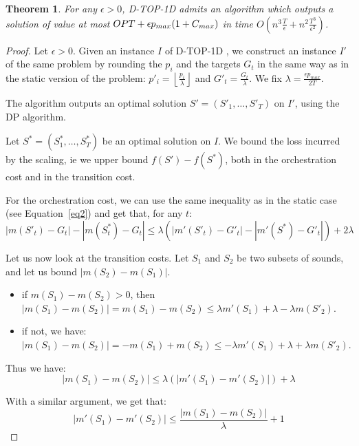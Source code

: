 \documentclass[a4paper]{book}
\newtheorem{theorem}{Theorem}[chapter]
\newtheorem{proof}{\noindent{\bf Proof.} }
\newcommand{\dynoned}{{\sc D-TOP-1D }}
\begin{document}
\begin{theorem}
For any $\epsilon>0$, \dynoned admits an algorithm which outputs a solution of value at most ${\sc OPT}+\epsilon p_{max}(1+C_{max})$ in time $O\left(n^3\frac{T}{\epsilon}+n^2\frac{T^3}{\epsilon^2}\right)$.
\end{theorem}


\begin{proof}
Let $\epsilon >0$. Given an instance $I$ of \dynoned, we construct an instance $I'$ of the same problem by rounding the $p_i$ and the targets $G_t$ in the same way as in the static version of the problem: $p'_i=\left\lfloor \frac{p_i}{\lambda}\right\rfloor$ and $G'_t=\frac{G_t}{\lambda}$. We fix $\lambda=\frac{\epsilon p_{max}}{2T}$.

The algorithm outputs an optimal solution $S'=(S'_1,\dots,S'_T)$  on $I'$, using the DP algorithm. 

Let $S^*=(S^*_1,\dots,S^*_T)$ be an optimal solution on $I$. We bound the loss incurred by the scaling, ie we upper bound $f(S')-f(S^*)$, both in the orchestration cost and in the transition cost.

For the orchestration cost, we can use the same inequality as in the static case (see Equation~\ref{eq2}) and get that, for any $t$:
\begin{equation}
|m(S'_t)-G_t|-|m(S^*_t)-G_t|  \leq   \lambda (\left|m'(S'_t) - G'_t\right| - \left|m'(S^*)-G'_t\right|) + 2\lambda \label{eq:bound2}
\end{equation}

Let us now look at the transition costs. Let $S_1$ and $S_2$ be two subsets of sounds, and let us bound $|m(S_2)-m(S_1)|$.
\begin{itemize}\item if $m(S_1)-m(S_2)>0$,  then $|m(S_1)-m(S_2)|=m(S_1)-m(S_2) \leq \lambda m'(S_1) + \lambda - \lambda m(S'_2)$.
\item if not, we have: $|m(S_1)-m(S_2)|=-m(S_1)+m(S_2) \leq -\lambda m'(S_1) + \lambda + \lambda m(S'_2)$.
\end{itemize}

Thus we have: \begin{equation}\label{eq:b3}
    |m(S_1)-m(S_2)|\leq \lambda(|m'(S_1)-m'(S_2)|)+\lambda
\end{equation}

With a similar argument, we get that:
\begin{equation}\label{eq:b4}|m'(S_1)-m'(S_2)|\leq \frac{|m(S_1)-m(S_2)|}{\lambda}+1\end{equation}


\end{proof}
\end{document}
